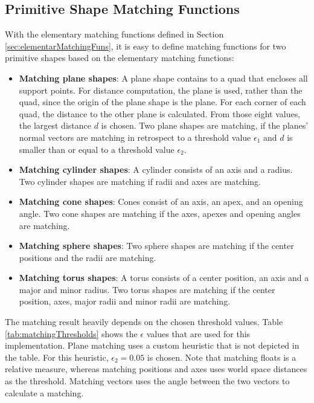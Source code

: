 \subsection{Primitive Shape Matching Functions}
\label{sec:primitiveShapeMatchingFuns}

With the elementary matching functions defined in Section \ref{sec:elementarMatchingFuns}, it is easy to define matching functions for two primitive shapes based on the elementary matching functions:

\begin{itemize}
\item \textbf{Matching plane shapes}: 
A plane shape contains to a quad that encloses all support points. For distance computation, the plane is used, rather than the quad, since the origin of the plane shape is the plane. For each corner of each quad, the distance to the other plane is calculated. From those eight values, the largest distance $d$ is chosen. Two plane shapes are matching, if the planes' normal vectors are matching in retrospect to a threshold value $\epsilon_1$ and $d$ is smaller than or equal to a threshold value $\epsilon_2$.
\item \textbf{Matching cylinder shapes}: 
A cylinder consists of an axis and a radius. Two cylinder shapes are matching if radii and axes are matching. 
\item \textbf{Matching cone shapes}:
Cones consist of an axis, an apex, and an opening angle. Two cone shapes are matching if the axes, apexes and opening angles are matching. 
\item \textbf{Matching sphere shapes}: 
Two sphere shapes are matching if the center positions and the radii are matching. 
\item \textbf{Matching torus shapes}: 
A torus consists of a center position, an axis and a major and minor radius. Two torus shapes are matching if the center position, axes, major radii and minor radii are matching. 
\end{itemize}

The matching result heavily depends on the chosen threshold values. Table \ref{tab:matchingThresholds} shows the $\epsilon$ values that are used for this implementation. Plane matching uses a custom heuristic that is not depicted in the table. For this heuristic, $\epsilon_2 = 0.05$ is chosen. Note that matching floats is a relative measure, whereas matching positions and axes uses world space distances as the threshold. Matching vectors uses the angle between the two vectors to calculate a matching. 

